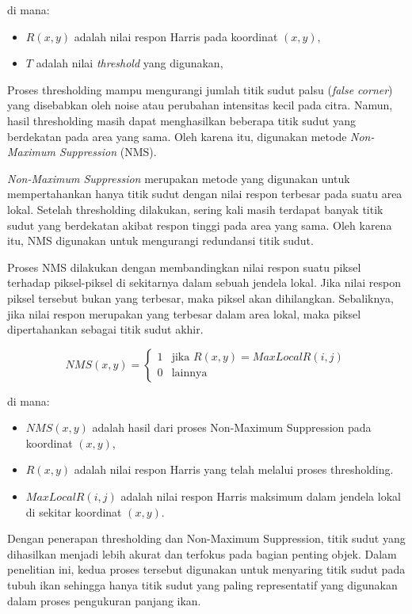 di mana:
\begin{itemize}
    \item $R(x,y)$ adalah nilai respon Harris pada koordinat $(x,y)$,
    \item $T$ adalah nilai \textit{threshold} yang digunakan,
\end{itemize}

Proses thresholding mampu mengurangi jumlah titik sudut palsu (\textit{false corner}) yang disebabkan oleh noise atau perubahan intensitas kecil pada citra. Namun, hasil thresholding masih dapat menghasilkan beberapa titik sudut yang berdekatan pada area yang sama. Oleh karena itu, digunakan metode \textit{Non-Maximum Suppression} (NMS).

\textit{Non-Maximum Suppression} merupakan metode yang digunakan untuk mempertahankan hanya titik sudut dengan nilai respon terbesar pada suatu area lokal. Setelah thresholding dilakukan, sering kali masih terdapat banyak titik sudut yang berdekatan akibat respon tinggi pada area yang sama. Oleh karena itu, NMS digunakan untuk mengurangi redundansi titik sudut.

Proses NMS dilakukan dengan membandingkan nilai respon suatu piksel terhadap piksel-piksel di sekitarnya dalam sebuah jendela lokal. Jika nilai respon piksel tersebut bukan yang terbesar, maka piksel akan dihilangkan. Sebaliknya, jika nilai respon merupakan yang terbesar dalam area lokal, maka piksel dipertahankan sebagai titik sudut akhir.

\[
    NMS(x,y) =
    \begin{cases}
        1 & \text{jika } R(x,y) = MaxLocal R(i,j) \\
        0 & \text{lainnya }
    \end{cases}
\]

di mana:
\begin{itemize}
    \item $NMS(x,y)$ adalah hasil dari proses Non-Maximum Suppression pada koordinat $(x,y)$,
    \item $R(x,y)$ adalah nilai respon Harris yang telah melalui proses thresholding.
    \item $MaxLocal R(i,j)$ adalah nilai respon Harris maksimum dalam jendela lokal di sekitar koordinat $(x,y)$.
\end{itemize}

Dengan penerapan thresholding dan Non-Maximum Suppression, titik sudut yang dihasilkan menjadi lebih akurat dan terfokus pada bagian penting objek. Dalam penelitian ini, kedua proses tersebut digunakan untuk menyaring titik sudut pada tubuh ikan sehingga hanya titik sudut yang paling representatif yang digunakan dalam proses pengukuran panjang ikan.


